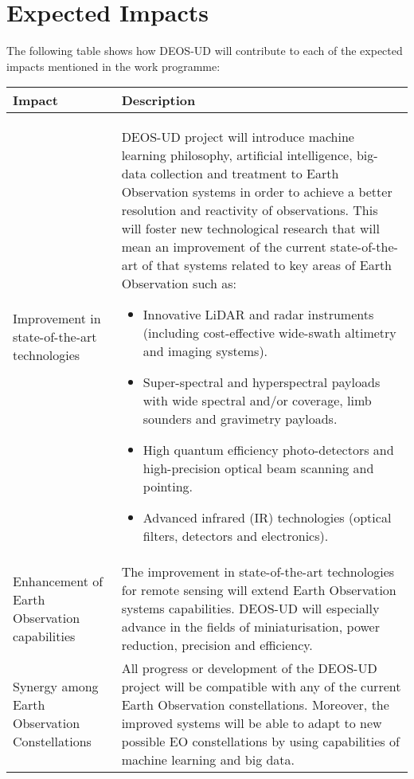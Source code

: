 \section{Expected Impacts}

The following table shows how DEOS-UD will contribute to each of the expected impacts mentioned in the work programme:

\begin{longtable}{>{\raggedright\arraybackslash}p{3cm} p{11cm}}
	
	\toprule[2pt]
	
	\textbf{Impact} &  \textbf{Description}\\
	
	\midrule [1.5pt]
	\endhead
	
	Improvement in state-of-the-art technologies & DEOS-UD project will introduce machine learning philosophy, artificial intelligence, big-data collection and treatment to Earth Observation systems in order to achieve a better resolution and reactivity of observations. This will foster new technological research that will mean an improvement of the current state-of-the-art of that systems related to key areas of Earth Observation such as: 
	\begin{itemize}  
		\item Innovative LiDAR and radar instruments (including cost-effective wide-swath altimetry and imaging systems).
		\item Super-spectral and hyperspectral payloads with wide spectral and/or coverage, limb sounders and gravimetry payloads.
		\item High quantum efficiency photo-detectors and high-precision optical beam scanning and pointing.
		\item Advanced infrared (IR) technologies (optical filters, detectors and electronics).
	\end{itemize}\\
	
	\midrule
	
	Enhancement of Earth Observation capabilities & The improvement in state-of-the-art technologies for remote sensing will extend Earth Observation systems capabilities. DEOS-UD will especially advance in the fields of miniaturisation, power reduction, precision and efficiency.\vspace{0.2cm}\\
	
	\midrule
	
	Synergy among Earth Observation Constellations & All progress or development of the DEOS-UD project will be compatible with any of the current Earth Observation constellations. Moreover, the improved systems will be able to adapt to new possible EO constellations by using capabilities of machine learning and big data.\vspace{0.2cm}\\
	

\end{longtable}
